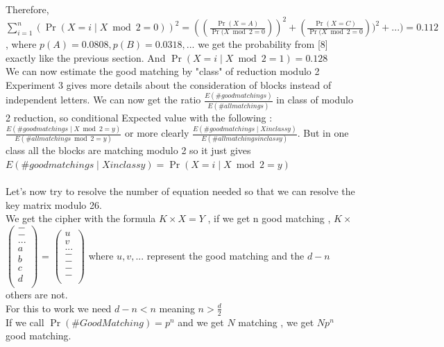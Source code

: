 \documentclass{article}
\begin{document}
Therefore, $\sum_{i=1}^{n}{(\Pr (X=i \mid X \bmod 2 = 0))^{2}} = ((\frac{\Pr(X=A)}{\Pr(X \bmod 2 = 0}))^{2} + (\frac{\Pr(X=C)}{\Pr(X \bmod 2 = 0}))^{2} + ... )= 0.112$ , where $p(A)=0.0808 , p(B)=0.0318 , ...$  we get the probability from [8] exactly like the previous section.
And $\Pr(X=i \mid X \bmod 2 = 1) = 0.128$\\
We can now estimate the good matching by "class" of reduction modulo 2
Experiment 3 gives more details about the consideration of blocks instead of independent letters.
We can now get the ratio $\frac{E(\# good matchings)}{E(\# all matchings)}$ in class of modulo 2 reduction, so conditional Expected value with the following : $\frac{E(\# good matchings \mid X \bmod 2 = y)}{E(\# all matchings \bmod 2 = y)}$ or more clearly $\frac{E(\# good matchings \mid X in class y)}{E(\# all matchings in class y)}$. But in one class all the blocks are matching modulo 2 so it just gives $E(\# good matchings \mid X in class y)  = \Pr (X=i \mid X \bmod 2 = y) $\\
\\
Let's now try to resolve the number of equation needed so that we can resolve the key matrix modulo 26.\\
We get the cipher with the formula $ K \times X = Y$ , if we get n good matching , $ K \times $  $\begin{pmatrix}
  - \\
  - \\
  ... \\
  a \\
	b\\
	c\\
	d\\
 \end{pmatrix} $
 = $\begin{pmatrix}
  u \\
  v \\
  ... \\
  - \\
	-\\
	-\\
	-\\
 \end{pmatrix}$
where $ u , v , ... $ represent the good matching and the $d-n $ others are not.\\
For this to work we need $d-n < n $ meaning $n > \frac{d}{2}$\\
If we call $\Pr(\#Good Matching)=p^n $ and we get $N$ matching , we get $N p^n$ good matching.\\
\end{document}
